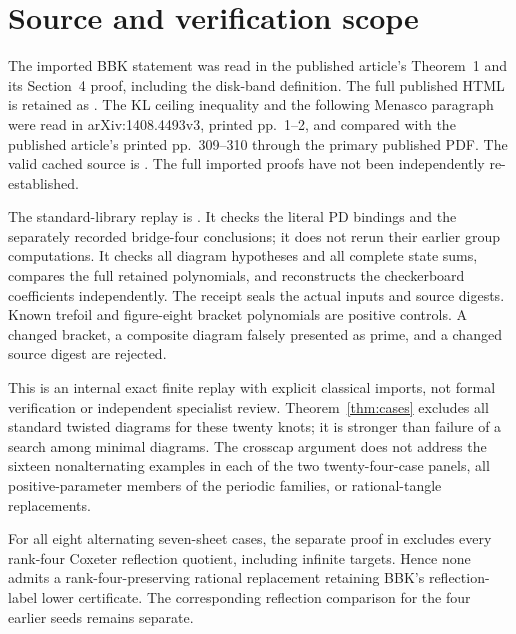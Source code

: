 \documentclass[11pt]{article}
\begin{document}
\section{Source and verification scope}

The imported BBK statement was read in the published article's
Theorem~1 and its Section~4 proof, including the disk-band definition.
The full published HTML is retained as
.
The KL ceiling inequality and the following Menasco paragraph were
read in arXiv:1408.4493v3, printed pp.~1--2, and compared with the
published article's printed pp.~309--310 through the primary
published PDF. The valid cached source is
.
The full imported proofs have not been independently re-established.

The standard-library replay is
.
It checks the literal PD bindings and the separately recorded
bridge-four conclusions; it does not rerun their earlier group
computations. It checks all diagram hypotheses and all complete
state sums, compares the full retained polynomials, and reconstructs
the checkerboard coefficients independently.
The receipt 
seals the actual inputs and source digests.
Known trefoil and figure-eight bracket polynomials are positive
controls. A changed bracket, a composite diagram falsely presented
as prime, and a changed source digest are rejected.

This is an internal exact finite replay with explicit classical
imports, not formal verification or independent specialist review.
Theorem~\ref{thm:cases} excludes all standard twisted diagrams for
these twenty knots; it is stronger than failure of a search among
minimal diagrams. The crosscap argument does not address the sixteen
nonalternating examples in each of the two twenty-four-case panels, all positive-parameter
members of the periodic families, or rational-tangle replacements.

For all eight alternating seven-sheet cases, the separate proof in
 excludes every rank-four
Coxeter reflection quotient, including infinite targets. Hence none
admits a rank-four-preserving rational replacement retaining BBK's
reflection-label lower certificate. The corresponding reflection
comparison for the four earlier seeds remains separate.
\end{document}

